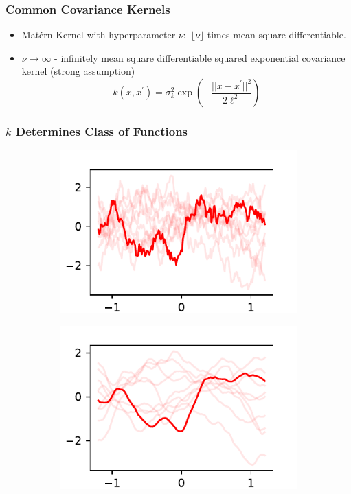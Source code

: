\documentclass{beamer}
\begin{document}
\begin{frame}
    \frametitle{Common Covariance Kernels}
    \begin{itemize}
        \item Mat\'ern Kernel with hyperparameter $\nu:$
              $\lfloor{\nu}\rfloor$ times mean square differentiable.
        \item $\nu\to\infty$ - infinitely mean square differentiable squared
              exponential covariance kernel (strong assumption)
              $$
                  k(x, x^\prime)
                  = \sigma^2_k\exp(-\frac{||x - x^\prime||^2}{2\ell^2})
              $$
    \end{itemize}
\end{frame}

\begin{frame}
    \frametitle{$k$ Determines Class of Functions}
    \begin{figure}
        \centering
        \begin{subfigure}[t]{0.4\textwidth}
            \centering
            \includegraphics[width=\textwidth]{maternonehalf_kernel.pdf}
        \end{subfigure}%
        \begin{subfigure}[t]{0.4\textwidth}
            \centering
            \includegraphics[width=\textwidth]{maternthreehalves_kernel.pdf}

\end{subfigure}
\end{figure}
\end{frame}
\end{document}
